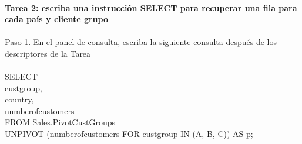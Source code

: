 \begin{flushleft}
\begin{center}
\end{center}
\textbf{}\\
\textbf{}\\
\textbf{}\\
\textbf{}\\
\textbf{}\\
\textbf{}\\

\textbf{}\\
\textbf{}\\
\textbf{}\\
\textbf{}\\
\textbf{}\\

\textbf {Tarea 2: escriba una instrucción SELECT para recuperar una fila para cada país y cliente grupo}
\textbf{}\\
\textbf{}\\
Paso 1. En el panel de consulta, escriba la siguiente consulta después de los descriptores de la Tarea 
\textbf{}\\
\textbf{}\\
SELECT\\
custgroup,\\
country,\\
numberofcustomers\\
FROM Sales.PivotCustGroups\\
UNPIVOT (numberofcustomers FOR custgroup IN (A, B, C)) AS p;
\textbf{}\\
\textbf{}\\


\end{flushleft}
